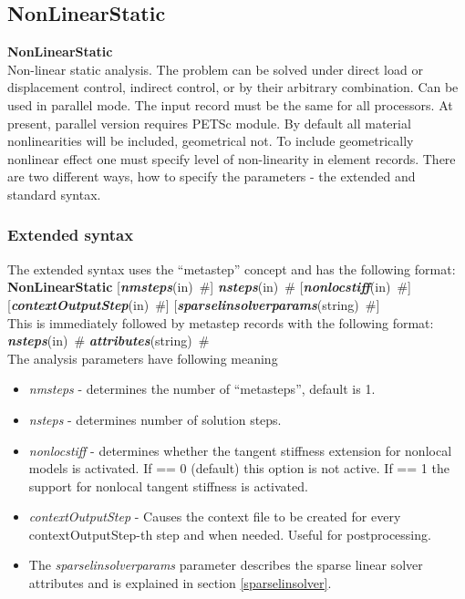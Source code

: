 \documentclass[draft]{article}
\newcommand{\param}[1]{{\em #1}}
\newcommand{\fieldVal}[2]{\mbox{({\it\bf{#1}\#)\tiny (#2)}}}
\newcommand{\keywordnotype}[1]{\mbox{{\it{\bf{#1}}}}}
\newcommand{\keyword}[2]{\mbox{{\keywordnotype{#1}\tiny (#2)}}}
\newcommand{\entKeywordInst}[1]{\mbox{{\bf{{#1}}}}}
\newcommand{\field}[2]{\mbox{\keyword{#1}{#2}~\#}}
\newcommand{\optField}[2]{\mbox{[\field{#1}{#2}]}}
\newcommand{\Pmode}[1]{{\sffamily #1}}
\begin{document}
\subsection{NonLinearStatic}
\label{NonLinearStatic}
\entKeywordInst{NonLinearStatic} \\
Non-linear static analysis. The problem can be solved under 
direct load or displacement control, indirect control, or by
their arbitrary combination.
\Pmode{Can be used in parallel mode. The input record must be the same
for all processors. At present, parallel version requires PETSc module.}
By default all
material nonlinearities will be included, geometrical not. 
To include geometrically nonlinear effect one must specify
level of non-linearity in element records.
There are two different ways, how to specify the parameters - the
extended and standard syntax. 
\subsubsection{Extended syntax}
The extended syntax uses the ``metastep'' concept and has the
following format:
\entKeywordInst{NonLinearStatic} \optField{nmsteps}{in} \field{nsteps}{in}
\optField{nonlocstiff}{in}\\ \optField{contextOutputStep}{in}
\optField{sparselinsolverparams}{string}\\
This is immediately followed by metastep records with the following format:
\field{nsteps}{in} \field{attributes}{string}\\
The analysis parameters have following meaning
\begin{itemize}
\item \param{nmsteps} - determines the number of
``metasteps'', default is 1.
\item \param{nsteps} - determines number of solution steps.
\item \param{nonlocstiff} - determines whether the tangent stiffness
extension for nonlocal models is activated. If == 0 (default) this
option is not active. If == 1 the support for nonlocal tangent
stiffness is activated.
\item \param{contextOutputStep} - Causes the context file to be
created for every con\-text\-Out\-put\-Step-th step and when needed. Useful for
postprocessing.
\item The  \param{sparselinsolverparams} parameter describes the sparse
linear solver attributes and is explained in section \ref{sparselinsolver}.

\end{itemize}
\end{document}
